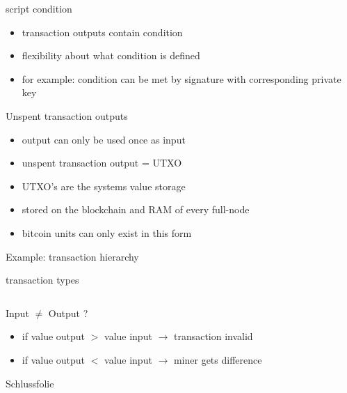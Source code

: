 \documentclass[]{beamer}
\begin{document}
\begin{frame}{script condition}
\begin{itemize}
    \item<1->{transaction outputs contain condition}
    \item<2->{flexibility about what condition is defined}
    \item<3->{for example: condition can be met by signature with corresponding private key}
\end{itemize}
\end{frame}        


\begin{frame}{Unspent transaction outputs}
\begin{itemize}
    \item<1->{output can only be used once as input}
    \item<2->{unspent transaction output = UTXO}
    \item<3->{UTXO's are the systems value storage}
    \item<4->{stored on the blockchain and RAM of every full-node}
    \item<5->{bitcoin units can only exist in this form}
\end{itemize}    
\end{frame}


\begin{frame}{Example: transaction hierarchy}
\resizebox{10.7cm}{7cm}{

}
\end{frame}


\begin{frame}{transaction types}
\begin{columns}

\vspace{1cm}
 
\vspace{0.4cm}



\vspace{0.5cm}


\end{columns}
\end{frame}


\begin{frame}{Input $\neq$ Output ?}
\begin{itemize}
    \item<1->{if value output $>$ value input $\rightarrow$ transaction invalid}
    \item<2->{if value output $<$ value input $\rightarrow$ miner gets difference}
    \end{itemize} 
    \vspace{2em}
\begin{center}
\end{center}  
\end{frame}


\begin{frame}{Schlussfolie}

\end{frame}
\end{document}
